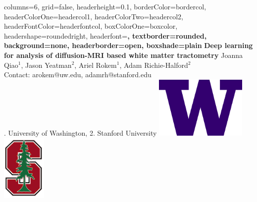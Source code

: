 \documentclass[a0paper,landscape,fontscale=0.365]{baposter}
\begin{document}
\begin{poster}{
    columns=6,
    grid=false,
    headerheight=0.1\textheight,
    borderColor=bordercol, %
    headerColorOne=headercol1, %
    headerColorTwo=headercol2, %
    headerFontColor=headerfontcol, %
    boxColorOne=boxcolor, %
    headershape=roundedright, %
    headerfont=\Large\sf\bf, %
    textborder=rounded,
    background=none,
    headerborder=open, %
    boxshade=plain
}
{}
%
%
{\sf\bf Deep learning for analysis of diffusion-MRI based white matter tractometry} %
{%
    Joanna Qiao{$^1$}, Jason Yeatman{$^2$}, Ariel Rokem{$^1$}, Adam Richie-Halford{$^2$}
    \\ Contact: arokem@uw.edu, adamrh@stanford.edu \hspace{0.5em} \null \\ %
    {. University of Washington, %
        2. Stanford University %
        \hfill %
    }
} %
{%
\includegraphics[align=c,height=3.00cm]{logos/UWlogo.png}%
\includegraphics[align=c,height=3.20cm]{logos/stanford_logo.png}%
}
\vspace{-10em}



\end{poster}
\end{document}
